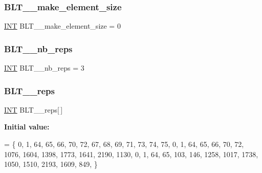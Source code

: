 \subsubsection{\texorpdfstring{B\+L\+T\+\_\+\_\+make\+\_\+element\+\_\+size}{BLT\_13\_make\_element\_size}}
{\footnotesize\ttfamily \mbox{\hyperlink{galois_8h_a09fddde158a3a20bd2dcadb609de11dc}{I\+NT}} B\+L\+T\+\_\+\_\+make\+\_\+element\+\_\+size = 0}

\mbox{\label{data___b_l_t_8_c_a9846607d3a0fb24aab17a9a123f0ad68}} 
\subsubsection{\texorpdfstring{B\+L\+T\+\_\+\_\+nb\+\_\+reps}{BLT\_13\_nb\_reps}}
{\footnotesize\ttfamily \mbox{\hyperlink{galois_8h_a09fddde158a3a20bd2dcadb609de11dc}{I\+NT}} B\+L\+T\+\_\+\_\+nb\+\_\+reps = 3}

\mbox{\label{data___b_l_t_8_c_ac683117abd45ea7068a93136d8fa7711}} 
\subsubsection{\texorpdfstring{B\+L\+T\+\_\+\_\+reps}{BLT\_13\_reps}}
{\footnotesize\ttfamily \mbox{\hyperlink{galois_8h_a09fddde158a3a20bd2dcadb609de11dc}{I\+NT}} B\+L\+T\+\_\+\_\+reps\mbox{[}$\,$\mbox{]}}

{\bfseries Initial value\+:}
\begin{DoxyCode}
= \{
    0, 1, 64, 65, 66, 70, 72, 67, 68, 69, 71, 73, 74, 75, 
    0, 1, 64, 65, 66, 70, 72, 1076, 1604, 1398, 1773, 1641, 2190, 1130, 
    0, 1, 64, 65, 103, 146, 1258, 1017, 1738, 1050, 1510, 2193, 1609, 849, 
\}
\end{DoxyCode}
\mbox{\label{data___b_l_t_8_c_a6edda5aa4a0b4a9100b28804c2a15fdb}} 
